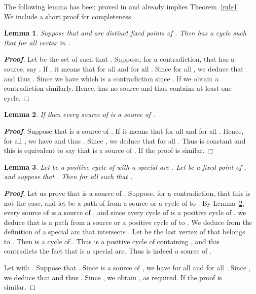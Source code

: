 \documentclass[11pt,a4paper]{article}
\newtheorem{lemma}{Lemma}
\begin{document}
The following lemma has been proved in \cite[Theorem 9]{A08} and already implies Theorem~\ref{rule1}. We include a short proof for completeness.  

\begin{lemma}\label{alphabeta_lemma}
Suppose that  and  are distinct fixed points of . Then  has a cycle  such that  for all vertex  in . 
\end{lemma}


\begin{proof}[{\bf Proof}]
Let  be the set of  such that . Suppose, for a contradiction, that  has a source, say . If , it means that  for all  and  for all . Since  for all , we deduce that  and thus . Since  we have  which is a contradiction since . If  we obtain a contradiction similarly. Hence,  has no source and thus contains at least one cycle. 
\end{proof}

\begin{lemma}\label{source_lemma}
If  then every source of  is a source of . 
\end{lemma}


\begin{proof}[{\bf Proof}]
Suppose that  is a source of . If  it means that  for all  and  for all . Hence, for all , we have  and thus . Since , we deduce that  for all . Thus  is constant and this is equivalent to say that  is a source of . If  the proof is similar.  
\end{proof}

\begin{lemma}\label{canalizing}
Let  be a positive cycle of  with a special arc . Let  be a fixed point of , and suppose that . Then  for all  such that . 
\end{lemma}


\begin{proof}[{\bf Proof}]
Let us prove that  is a source of . Suppose, for a contradiction, that this is not the case, and let  be a path of  from a source or a cycle of  to . By Lemma~\ref{source_lemma}, every source of  is a source of , and since every cycle of  is a positive cycle of , we deduce that  is a path from a source or a positive cycle of  to . We deduce from the definition of a special arc that  intersects . Let  be the last vertex of  that belongs to . Then  is a cycle of . Thus  is a positive cycle of  containing , and this contradicts the fact that  is a special arc. Thus  is indeed a source of . 

\medskip
Let  with . Suppose that . Since  is a source of , we have  for all  and  for all . Since , we deduce that  and thus . Since , we obtain , as required. If  the proof is similar.  
\end{proof}
\end{document}
